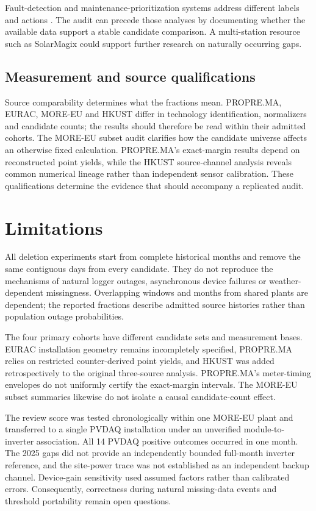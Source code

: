 \documentclass[preprint,12pt]{elsarticle}
\begin{document}
Fault-detection and maintenance-prioritization systems address different labels and actions \cite{laguna2024,miraftab2025,severiano2026,questfault2025,tang2026}. The audit can precede those analyses by documenting whether the available data support a stable candidate comparison. A multi-station resource such as SolarMagix \cite{daskalov2026} could support further research on naturally occurring gaps.

\subsection{Measurement and source qualifications}
Source comparability determines what the fractions mean. PROPRE.MA, EURAC, MORE-EU and HKUST differ in technology identification, normalizers and candidate counts; the results should therefore be read within their admitted cohorts. The MORE-EU subset audit clarifies how the candidate universe affects an otherwise fixed calculation. PROPRE.MA's exact-margin results depend on reconstructed point yields, while the HKUST source-channel analysis reveals common numerical lineage rather than independent sensor calibration. These qualifications determine the evidence that should accompany a replicated audit.

\section{Limitations}
All deletion experiments start from complete historical months and remove the same contiguous days from every candidate. They do not reproduce the mechanisms of natural logger outages, asynchronous device failures or weather-dependent missingness. Overlapping windows and months from shared plants are dependent; the reported fractions describe admitted source histories rather than population outage probabilities.

The four primary cohorts have different candidate sets and measurement bases. EURAC installation geometry remains incompletely specified, PROPRE.MA relies on restricted counter-derived point yields, and HKUST was added retrospectively to the original three-source analysis. PROPRE.MA's meter-timing envelopes do not uniformly certify the exact-margin intervals. The MORE-EU subset summaries likewise do not isolate a causal candidate-count effect.

The review score was tested chronologically within one MORE-EU plant and transferred to a single PVDAQ installation under an unverified module-to-inverter association. All 14 PVDAQ positive outcomes occurred in one month. The 2025 gaps did not provide an independently bounded full-month inverter reference, and the site-power trace was not established as an independent backup channel. Device-gain sensitivity used assumed factors rather than calibrated errors. Consequently, correctness during natural missing-data events and threshold portability remain open questions.
\end{document}
